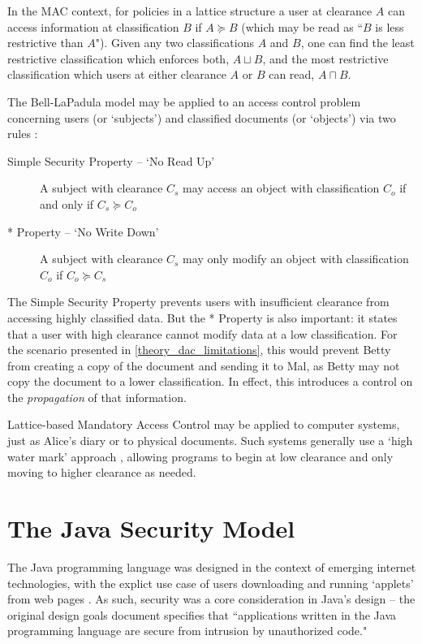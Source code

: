 In the MAC context, for policies in a lattice structure a user at clearance $ A $ can access information at classification $ B $ if $ A \succeq B $ (which may be read as ``$ B $ is less restrictive than $ A $"). Given any two classifications $ A $ and $ B $, one can find the least restrictive classification which enforces both, $ A \sqcup B $, and the most restrictive classification which users at either clearance $ A $ or $ B $ can read, $ A \sqcap B $.

The Bell-LaPadula model may be applied to an access control problem concerning users (or `subjects') and classified documents (or `objects') via two rules \cite{sandhu1993lattice}:

\begin{description}
	\item[Simple Security Property -- `No Read Up'] A subject with clearance $ C_s $ may access an object with classification $ C_o $ if and only if $ C_s \succeq C_o $
	
	\item[* Property -- `No Write Down'] A subject with clearance $ C_s $ may only modify an object with classification $ C_o $ if $ C_o \succeq C_s $
\end{description}

The Simple Security Property prevents users with insufficient clearance from accessing highly classified data. But the * Property is also important: it states that a user with high clearance cannot modify data at a low classification. For the scenario presented in \ref{theory_dac_limitations}, this would prevent Betty from creating a copy of the document and sending it to Mal, as Betty may not copy the document to a lower classification. In effect, this introduces a control on the \textit{propagation} of that information.

Lattice-based Mandatory Access Control may be applied to computer systems, just as Alice's diary or to physical documents. Such systems generally use a `high water mark' approach \cite{jones1975highwatermark}, allowing programs to begin at low clearance and only moving to higher clearance as needed.

\section{The Java Security Model} \label{theory_javasec}

The Java programming language was designed in the context of emerging internet technologies, with the explict use case of users downloading and running `applets' from web pages \cite{gong1999javasecspec}. As such, security was a core consideration in Java's design -- the original design goals document \cite{javadesignprinciples} specifies that ``applications written in the Java programming language are secure from intrusion by unauthorized code."
 
